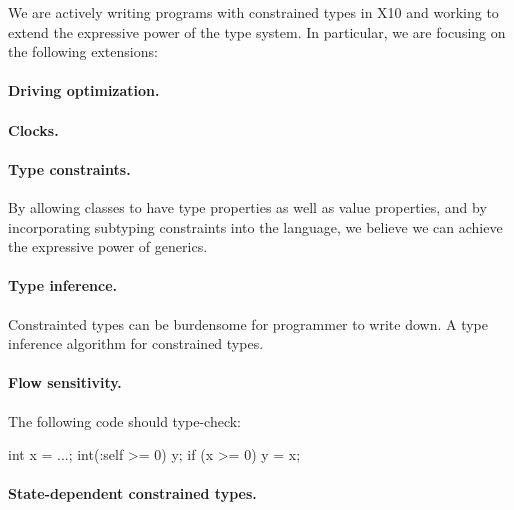 %
%
%
%

We are actively writing programs with constrained types in X10 and 
working to extend the expressive power of the type system.
In particular, we are focusing on the following extensions:

\paragraph{Driving optimization.}
\paragraph{Clocks.}
\paragraph{Type constraints.}
By allowing classes to have type properties as well as value properties,
and by incorporating subtyping constraints into the language, we believe we can achieve the expressive power of generics.

\paragraph{Type inference.}  Constrainted types can be burdensome for
programmer to write down.  A type inference algorithm for constrained types.

\paragraph{Flow sensitivity.}  The following code should type-check:
\begin{xten}
int x = ...;
int(:self >= 0) y;
if (x >= 0) {
    y = x;
}
\end{xten}

\paragraph{State-dependent constrained types.}

